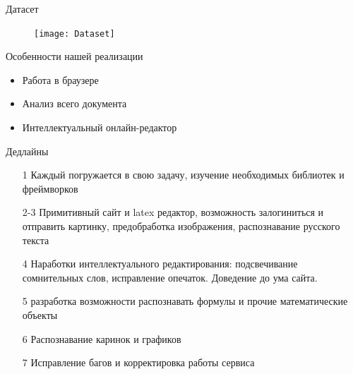 \documentclass{beamer}
\begin{document}
\begin{frame}{Датасет}
    \begin{figure}
        \centering
        \texttt{[image: Dataset]}
        \label{fig:math}
    \end{figure}
\end{frame}
\begin{frame}{Особенности нашей реализации}
    \begin{itemize}
        \item Работа в браузере
        \item Анализ всего документа
        \item Интеллектуальный онлайн-редактор
    \end{itemize}
\end{frame}
\begin{frame}{Дедлайны}
         \begin{enumerate}
            \item[1] Каждый погружается в свою задачу, изучение необходимых библиотек и фреймворков
             \item[2-3]  Примитивный сайт и latex редактор, возможность залогиниться и отправить картинку, предобработка изображения, распознавание русского текста
             \item[4] Наработки интеллектуального редактирования: подсвечивание сомнительных слов, исправление опечаток. Доведение до ума сайта.
             \item[5] разработка возможности распознавать формулы и прочие математические объекты
             \item[6] Распознавание каринок и графиков
             \item[7] Исправление багов и корректировка работы сервиса
        \end{enumerate}
\end{frame}
\end{document}
